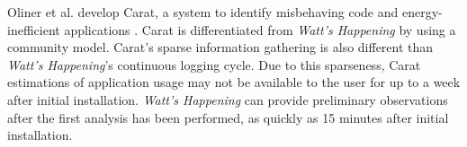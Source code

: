 Oliner et al. develop Carat, a system to identify misbehaving code and energy-inefficient applications \cite{Oliner:2012:CED:2387858.2387864}.
Carat is differentiated from \emph{Watt's Happening} by using a community model.
Carat's sparse information gathering is also different than \emph{Watt's Happening}'s continuous logging cycle.
Due to this sparseness, Carat estimations of application usage may not be available to the user for up to a week after initial installation.
\emph{Watt's Happening} can provide preliminary observations after the first analysis has been performed, as quickly as 15 minutes after initial installation.

%
% 	
% 
